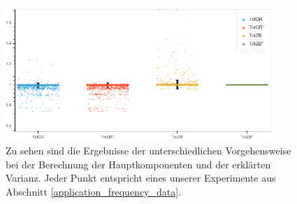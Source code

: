 \begin{figure}
\centering
\includegraphics[width = 0.9\textwidth]{figures/total_variance_validation.png}
\caption{Zu sehen sind die Ergebnisse der unterschiedlichen Vorgehensweise bei der Berechnung der Hauptkomponenten und der erklärten Varianz. Jeder Punkt entspricht eines unserer Experimente aus Abschnitt \ref{application_frequency_data}.}
\label{total_variance_validation}
\end{figure}